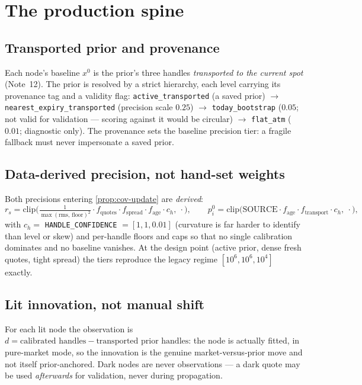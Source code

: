 \documentclass[11pt]{article}
\begin{document}
\section{The production spine}
\label{sec:spine}

\subsection{Transported prior and provenance}

Each node's baseline $x^0$ is the prior's three handles \emph{transported to the
current spot} (Note~12). The prior is resolved by a strict hierarchy, each level
carrying its provenance tag and a validity flag: \texttt{active\_transported}
(a saved prior) $\to$ \texttt{nearest\_expiry\_transported} (precision scale
$0.25$) $\to$ \texttt{today\_bootstrap} ($0.05$; not valid for validation ---
scoring against it would be circular) $\to$ \texttt{flat\_atm} ($0.01$;
diagnostic only). The provenance sets the baseline precision tier: a fragile
fallback must never impersonate a saved prior.

\subsection{Data-derived precision, not hand-set weights}

Both precisions entering \cref{prop:cov-update} are \emph{derived}:
\[
r_s=\mathrm{clip}\!\Big(\tfrac{1}{\max(\mathrm{rms},\,\mathrm{floor})^2}
\cdot f_{\text{quotes}}\cdot f_{\text{spread}}\cdot f_{\text{age}}\cdot
c_h,\ \cdot\Big),
\qquad
p^0_i=\mathrm{clip}\!\Big(\mathrm{SOURCE}\cdot f_{\text{age}}\cdot
f_{\text{transport}}\cdot c_h,\ \cdot\Big),
\]
with $c_h=$ \texttt{HANDLE\_CONFIDENCE} $=[1,1,0.01]$ (curvature is far harder
to identify than level or skew) and per-handle floors and caps so that no
single calibration dominates and no baseline vanishes. At the design point
(active prior, dense fresh quotes, tight spread) the tiers reproduce the legacy
regime $[10^6,10^6,10^4]$ exactly.

\subsection{Lit innovation, not manual shift}

For each lit node the observation is $d=\text{calibrated handles}-
\text{transported prior handles}$: the node is actually fitted, in pure-market
mode, so the innovation is the genuine market-versus-prior move and not itself
prior-anchored. Dark nodes are never observations --- a dark quote may be used
\emph{afterwards} for validation, never during propagation.
\end{document}
